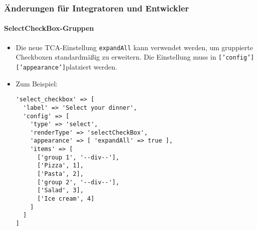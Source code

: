 %

\begin{frame}[fragile]
	\frametitle{Änderungen für Integratoren und Entwickler}
	\framesubtitle{SelectCheckBox-Gruppen}

	\lstset{basicstyle=\tiny\ttfamily}

	\begin{itemize}
		\item Die neue TCA-Einstellung \texttt{expandAll} kann verwendet werden,
			um gruppierte Checkboxen standardmäßig zu erweitern. Die Einstellung muss in \newline
			\smaller\texttt{['config']['appearance']}\normalsize platziert werden.
		\item Zum Beispiel:
\begin{lstlisting}
'select_checkbox' => [
  'label' => 'Select your dinner',
  'config' => [
    'type' => 'select',
    'renderType' => 'selectCheckBox',
    'appearance' => [ 'expandAll' => true ],
    'items' => [
      ['group 1', '--div--'],
      ['Pizza', 1],
      ['Pasta', 2],
      ['group 2', '--div--'],
      ['Salad', 3],
      ['Ice cream', 4]
    ]
  ]
]
\end{lstlisting}

	\end{itemize}

\end{frame}

